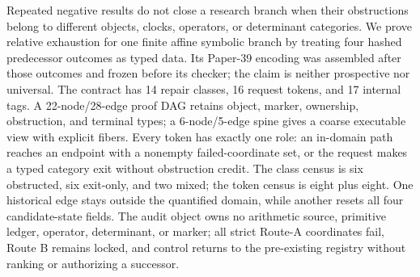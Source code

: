 Repeated negative results do not close a research branch when their
obstructions belong to different objects, clocks, operators, or determinant
categories.  We prove relative exhaustion for one finite affine symbolic branch
by treating four hashed predecessor outcomes as typed data.  Its Paper-39
encoding was assembled after those outcomes and frozen before its checker; the
claim is neither prospective nor universal.  The contract has 14 repair
classes, 16 request tokens, and 17 internal tags.  A 22-node/28-edge proof DAG
retains object, marker, ownership, obstruction, and terminal types; a
6-node/5-edge spine gives a coarse executable view with explicit fibers.  Every
token has exactly one role: an in-domain path reaches an endpoint with a
nonempty failed-coordinate set, or the request makes a typed category exit
without obstruction credit.  The class census is six obstructed, six exit-only,
and two mixed; the token census is eight plus eight.  One historical edge stays
outside the quantified domain, while another resets all four candidate-state
fields.  The audit object owns no arithmetic source, primitive ledger, operator,
determinant, or marker; all strict Route-A coordinates fail, Route B remains
locked, and control returns to the pre-existing registry without ranking or
authorizing a successor.
